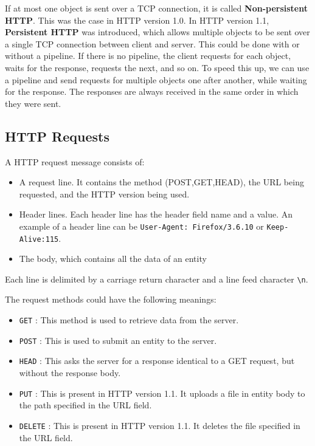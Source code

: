 \documentclass[12pt,letterpaper]{book}
\theoremstyle{definition}
\begin{document}
If at most one object is sent over a TCP connection, it is called \textbf{Non-persistent HTTP}. This was the case in HTTP version 1.0. In HTTP version 1.1, \textbf{Persistent HTTP} was introduced, which allows multiple objects to be sent over a single TCP connection between client and server. This could be done with or without a pipeline. If there is no pipeline, the client requests for each object, waits for the response, requests the next, and so on. To speed this up, we can use a pipeline and send requests for multiple objects one after another, while waiting for the response. The responses are always received in the same order in which they were sent.

\subsection{HTTP Requests}

A HTTP request message consists of:

\begin{itemize}
  \item A request line. It contains the method (POST,GET,HEAD), the URL being requested, and the HTTP version being used.
  \item Header lines. Each header line has the header field name and a value. An example of a header line can be \texttt{User-Agent: Firefox/3.6.10} or \texttt{Keep-Alive:115}.
  \item The body, which contains all the data of an entity
\end{itemize}

Each line is delimited by a carriage return character  and a line feed character \texttt{\textbackslash n}.

The request methods could have the following meanings:

\begin{itemize}
  \item \texttt{GET} : This method is used to retrieve data from the server.
  \item \texttt{POST} : This is used to submit an entity to the server.
  \item \texttt{HEAD} : This asks the server for a response identical to a GET request, but without the response body.
  \item \texttt{PUT} : This is present in HTTP version 1.1. It uploads a file in entity body to the path specified in the URL field.
  \item \texttt{DELETE} : This is present in HTTP version 1.1. It deletes the file specified in the URL field.
\end{itemize}
\end{document}

